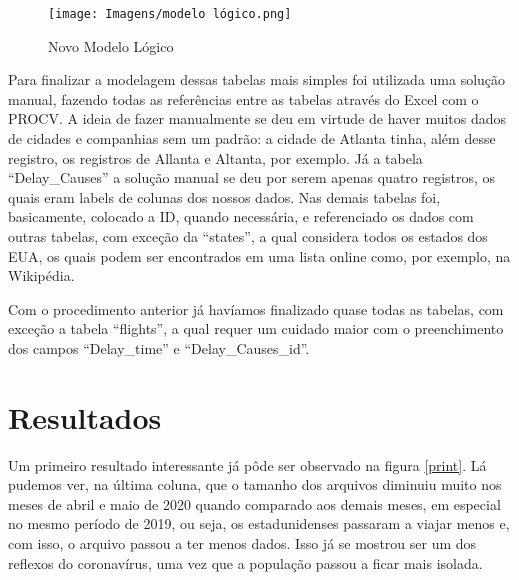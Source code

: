 \documentclass{article}
\begin{document}
	\begin{figure}
		\centering
		\texttt{[image: Imagens/modelo lógico.png]}
		\caption{Novo Modelo Lógico}
		\label{new_lógico}
	\end{figure}
	
	Para finalizar a modelagem dessas tabelas mais simples foi utilizada uma solução manual, fazendo todas as referências entre as tabelas através do Excel com o PROCV. A ideia de fazer manualmente se deu em virtude de haver muitos dados de cidades e companhias sem um padrão: a cidade de Atlanta tinha, além desse registro, os registros de Allanta e Altanta, por exemplo. Já a tabela ``Delay\_Causes'' a solução manual se deu por serem apenas quatro registros, os quais eram labels de colunas dos nossos dados. Nas demais tabelas foi, basicamente, colocado a ID, quando necessária, e referenciado os dados com outras tabelas, com exceção da ``states'', a qual considera todos os estados dos EUA, os quais podem ser encontrados em uma lista online como, por exemplo, na Wikipédia.
	
	Com o procedimento anterior já havíamos finalizado quase todas as tabelas, com exceção a tabela ``flights'', a qual requer um cuidado maior com o preenchimento dos campos ``Delay\_time'' e ``Delay\_Causes\_id''.
	
	\section{Resultados}
	
	Um primeiro resultado interessante já pôde ser observado na figura \ref{print}. Lá pudemos ver, na última coluna, que o tamanho dos arquivos diminuiu muito nos meses de abril e maio de 2020 quando comparado aos demais meses, em especial no mesmo período de 2019, ou seja, os estadunidenses passaram a viajar menos e, com isso, o arquivo passou a ter menos dados. Isso já se mostrou ser um dos reflexos do coronavírus, uma vez que a população passou a ficar mais isolada.
	
	
	
	\printbibliography
	
\end{document}
